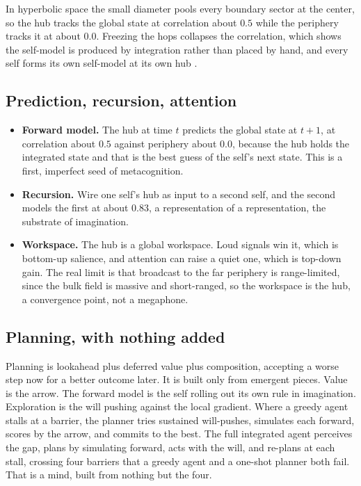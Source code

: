 \begin{result}
In hyperbolic space the small diameter pools every boundary sector at the center, so the hub tracks the global state at correlation about $0.5$ while the periphery tracks it at about $0.0$. Freezing the hops collapses the correlation, which shows the self-model is produced by integration rather than placed by hand, and every self forms its own self-model at its own hub \cite{pollard2026vibetest}.
\end{result}

\subsection{Prediction, recursion, attention}

\begin{itemize}
  \item \textbf{Forward model.} The hub at time $t$ predicts the global state at $t+1$, at correlation about $0.5$ against periphery about $0.0$, because the hub holds the integrated state and that is the best guess of the self's next state. This is a first, imperfect seed of metacognition.
  \item \textbf{Recursion.} Wire one self's hub as input to a second self, and the second models the first at about $0.83$, a representation of a representation, the substrate of imagination.
  \item \textbf{Workspace.} The hub is a global workspace. Loud signals win it, which is bottom-up salience, and attention can raise a quiet one, which is top-down gain. The real limit is that broadcast to the far periphery is range-limited, since the bulk field is massive and short-ranged, so the workspace is the hub, a convergence point, not a megaphone.
\end{itemize}

\subsection{Planning, with nothing added}

Planning is lookahead plus deferred value plus composition, accepting a worse step now for a better outcome later. It is built only from emergent pieces. Value is the arrow. The forward model is the self rolling out its own rule in imagination. Exploration is the will pushing against the local gradient. Where a greedy agent stalls at a barrier, the planner tries sustained will-pushes, simulates each forward, scores by the arrow, and commits to the best. The full integrated agent perceives the gap, plans by simulating forward, acts with the will, and re-plans at each stall, crossing four barriers that a greedy agent and a one-shot planner both fail. That is a mind, built from nothing but the four.

